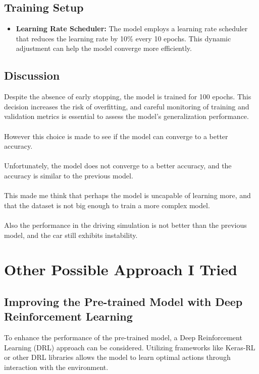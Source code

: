 \documentclass{article}
\begin{document}
\subsection{Training Setup}

\begin{itemize}
    \item \textbf{Learning Rate Scheduler:} The model employs a learning rate scheduler that reduces the learning rate by 10\% every 10 epochs. This dynamic adjustment can help the model converge more efficiently.

\end{itemize}

\subsection{Discussion}

Despite the absence of early stopping, the model is trained for 100 epochs. This decision increases the risk of overfitting, and careful monitoring of training and validation metrics is essential to assess the model's generalization performance.
\\
\\
However this choice is made to see if the model can converge to a better accuracy.
\\
\\
Unfortunately, the model does not converge to a better accuracy, and the accuracy is similar to the previous model.
\\
\\
This made me think that perhaps the model is uncapable of learning more, and that the dataset is not big enough to train a more complex model.
\\
\\
Also the performance in the driving simulation is not better than the previous model, and the car still exhibits instability.

\newpage

\section{Other Possible Approach I Tried}

\subsection{Improving the Pre-trained Model with Deep Reinforcement Learning}

To enhance the performance of the pre-trained model, a Deep Reinforcement Learning (DRL) approach can be considered. Utilizing frameworks like Keras-RL or other DRL libraries allows the model to learn optimal actions through interaction with the environment.
\end{document}
